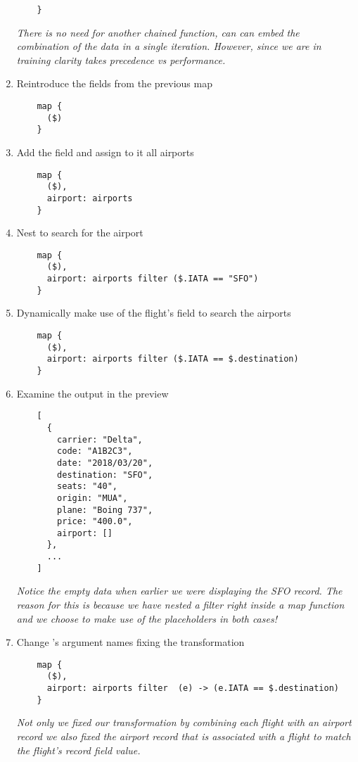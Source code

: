 \begin{enumerate}[resume*]
\begin{lstlisting}
    }
  \end{lstlisting}
  \emph{
    There is no need for another chained  function, can can embed the combination of the data in a single iteration.  However, since we are in training clarity takes precedence vs performance.
  }
\item Reintroduce the fields from the previous map
  \begin{lstlisting}
    map {
      ($)
    }
  \end{lstlisting}
\item Add the  field and assign to it all airports
  \begin{lstlisting}
    map {
      ($),
      airport: airports
    }
  \end{lstlisting}
\item Nest  to search for the  airport
  \begin{lstlisting}
    map {
      ($),
      airport: airports filter ($.IATA == "SFO")
    }
  \end{lstlisting}
\item Dynamically make use of the flight's  field to search the airports
  \begin{lstlisting}
    map {
      ($),
      airport: airports filter ($.IATA == $.destination)
    }
  \end{lstlisting}
\item Examine the output in the preview
  \begin{lstlisting}
    [
      {
        carrier: "Delta",
        code: "A1B2C3",
        date: "2018/03/20",
        destination: "SFO",
        seats: "40",
        origin: "MUA",
        plane: "Boing 737",
        price: "400.0",
        airport: []
      },
      ...
    ]
  \end{lstlisting}
  \emph{
    Notice the empty data when earlier we were displaying the SFO record.  The reason for this is because we have nested a filter right inside a map function and we choose to make use of the \ttt{\$} placeholders in both cases!
  }
\item Change 's \les{} argument names fixing the transformation
  \begin{lstlisting}
    map {
      ($),
      airport: airports filter  (e) -> (e.IATA == $.destination)
    }
  \end{lstlisting}
  \emph{
    Not only we fixed our transformation by combining each flight with an airport record we also fixed the airport record that is associated with a flight to match the flight's record  field value.
  } 
\end{enumerate}

